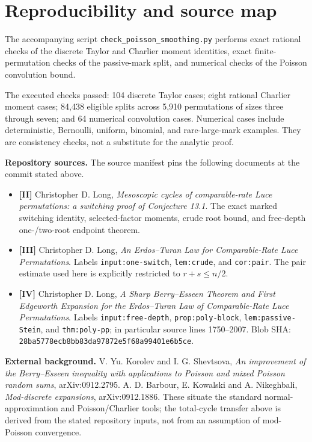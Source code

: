 \documentclass[
  11pt,
]{article}
\providecommand{\tightlist}{%
  \setlength{\itemsep}{0pt}\setlength{\parskip}{0pt}}
\begin{document}
\section{Reproducibility and source
map}\label{reproducibility-and-source-map}

The accompanying script \texttt{check\_poisson\_smoothing.py} performs
exact rational checks of the discrete Taylor and Charlier moment
identities, exact finite-permutation checks of the passive-mark split,
and numerical checks of the Poisson convolution bound.

The executed checks passed: 104 discrete Taylor cases; eight rational
Charlier moment cases; 84,438 eligible splits across 5,910 permutations
of sizes three through seven; and 64 numerical convolution cases.
Numerical cases include deterministic, Bernoulli, uniform, binomial, and
rare-large-mark examples. They are consistency checks, not a substitute
for the analytic proof.

\textbf{Repository sources.} The source manifest pins the following
documents at the commit stated above.

\begin{itemize}
\tightlist
\item
  \textbf{{[}II{]}} Christopher D. Long, \emph{Mesoscopic cycles of
  comparable-rate Luce permutations: a switching proof of Conjecture
  13.1}. The exact marked switching identity, selected-factor moments,
  crude root bound, and free-depth one-/two-root endpoint theorem.
\item
  \textbf{{[}III{]}} Christopher D. Long, \emph{An Erdos--Turan Law for
  Comparable-Rate Luce Permutations}. Labels \texttt{input:one-switch},
  \texttt{lem:crude}, and \texttt{cor:pair}. The pair estimate used here
  is explicitly restricted to \(r+s\le n/2\).
\item
  \textbf{{[}IV{]}} Christopher D. Long, \emph{A Sharp Berry--Esseen
  Theorem and First Edgeworth Expansion for the Erdos--Turan Law of
  Comparable-Rate Luce Permutations}. Labels \texttt{input:free-depth},
  \texttt{prop:poly-block}, \texttt{lem:passive-Stein}, and
  \texttt{thm:poly-pp}; in particular source lines 1750--2007. Blob SHA:
  \texttt{28ba5778ecb8bb83da97872e5f68a99401e6b5ce}.
\end{itemize}

\textbf{External background.} V. Yu. Korolev and I. G. Shevtsova,
\emph{An improvement of the Berry--Esseen inequality with applications
to Poisson and mixed Poisson random sums}, arXiv:0912.2795. A. D.
Barbour, E. Kowalski and A. Nikeghbali, \emph{Mod-discrete expansions},
arXiv:0912.1886. These situate the standard normal-approximation and
Poisson/Charlier tools; the total-cycle transfer above is derived from
the stated repository inputs, not from an assumption of mod-Poisson
convergence.
\end{document}
